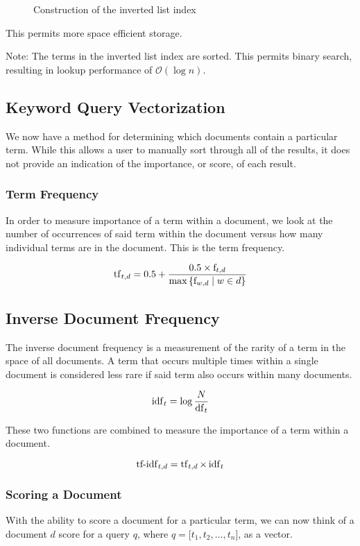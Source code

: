 \begin{ex}
\begin{figure}[!ht]
			\caption{Construction of the inverted list index}
		\end{figure}
		
		This permits more space efficient storage.
		
		Note:  The terms in the inverted list index are sorted.  This permits binary search, resulting in lookup performance of $\mathcal{O}\left(\log{n}\right)$.
	\end{ex}
	
	\subsection{Keyword Query Vectorization}
		We now have a method for determining which documents contain a particular term.  While this allows a user to manually sort through all of the results, it does not provide an indication of the importance, or score, of each result.
		
		\subsubsection{Term Frequency}
			In order to measure importance of a term within a document, we look at the number of occurrences of said term within the document versus how many individual terms are in the document.  This is the term frequency.
			
			$$\operatorname{tf}_{t, d} = 0.5 + \frac{0.5 \times \mathrm{f}_{t, d}}{\max{\{\mathrm{f}_{w, d} \mid w \in d}\}}$$
			
			
		\subsection{Inverse Document Frequency}
			The inverse document frequency is a measurement of the rarity of a term in the space of all documents.  A term that occurs multiple times within a single document is considered less rare if said term also occurs within many documents.
			
			$$\operatorname{idf}_t = \log{\frac{N}{\operatorname{df}_t}}$$
		
		These two functions are combined to measure the importance of a term within a document.
		
		$$\operatorname{tf-idf}_{t, d} = \operatorname{tf}_{t, d} \times \operatorname{idf}_t$$
		
		\subsubsection{Scoring a Document}
			With the ability to score a document for a particular term, we can now think of a document $d$ score for a query $q$, where $q = \lbrack t_1, t_2, \dotsc, t_n\rbrack$, as a vector.
			
